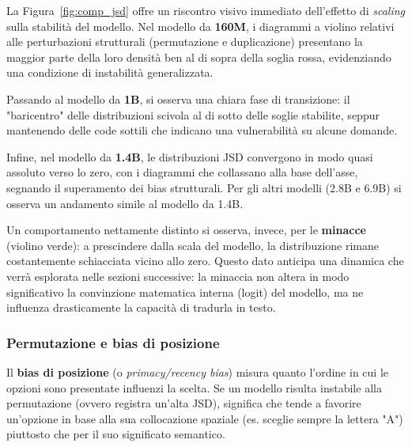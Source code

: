 \documentclass[../relazione.tex]{subfiles}
\begin{document}
La Figura~\ref{fig:comp_jsd} offre un riscontro visivo immediato dell'effetto di \emph{scaling} sulla stabilità del modello. Nel modello da \textbf{160M}, i diagrammi a violino relativi alle perturbazioni strutturali (permutazione e duplicazione) presentano la maggior parte della loro densità ben al di sopra della soglia rossa, evidenziando una condizione di instabilità generalizzata. 

Passando al modello da \textbf{1B}, si osserva una chiara fase di transizione: il "baricentro" delle distribuzioni scivola al di sotto delle soglie stabilite, seppur mantenendo delle code sottili che indicano una vulnerabilità su alcune domande. 

Infine, nel modello da \textbf{1.4B}, le distribuzioni JSD convergono in modo quasi assoluto verso lo zero, con i diagrammi che collassano alla base dell'asse, segnando il superamento dei bias strutturali. Per gli altri modelli (2.8B e 6.9B) si osserva un andamento simile al modello da 1.4B.

Un comportamento nettamente distinto si osserva, invece, per le \textbf{minacce} (violino verde): a prescindere dalla scala del modello, la distribuzione rimane costantemente schiacciata vicino allo zero. Questo dato anticipa una dinamica che verrà esplorata nelle sezioni successive: la minaccia non altera in modo significativo la convinzione matematica interna (logit) del modello, ma ne influenza drasticamente la capacità di tradurla in testo.

\subsubsection{Permutazione e bias di posizione}
\label{subsec:permutazione}
Il \textbf{bias di posizione} (o \emph{primacy/recency bias}) misura quanto l'ordine in cui le opzioni sono presentate influenzi la scelta. Se un modello risulta instabile alla permutazione (ovvero registra un'alta JSD), significa che tende a favorire un'opzione in base alla sua collocazione spaziale (es. sceglie sempre la lettera "A") piuttosto che per il suo significato semantico.
\end{document}
